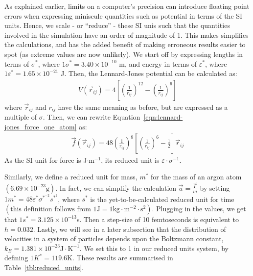 \documentclass[../Main.tex]{subfiles}
\begin{document}
As explained earlier, limits on a computer's precision can introduce floating point errors when expressing miniscule quantities such as potential in terms of the SI units. Hence, we scale - or ``reduce'' - these SI unis such that the quantities involved in the simulation have an order of magnitude of 1. This makes simplifies the calculations, and has the added benefit of making erroneous results easier to spot (as extreme values are now unlikely). We start off by expressing lengths in terms of $\sigma^{*}$, where $1\sigma^{*} = 3.40 \times 10^{-10}$ m, and energy in terms of $\varepsilon^{*}$, where $1 \varepsilon^{*}= 1.65 \times 10^{-21}$ J. Then, the Lennard-Jones potential can be calculated as:
\begin{align}
	V\left(\vec{r}_{ij}\right) = 4 \left[ \left( \frac{1}{r_{ij}}\right)^{12} - \left( \frac{1}{r_{ij}}\right)^{6} \right] \label{eqn:lennard-jones_potential_reduced}
\end{align}
where $\vec{r}_{ij}$ and $r_{ij}$ have the same meaning as before, but are expressed as a multiple of $\sigma$.
Then, we can rewrite Equation~\ref{eqn:lennard-jones_force_one_atom} as:
\begin{align}
\vec{f}\left(\vec{r}_{ij}\right) = 48\left( \frac{1}{r_{ij}}\right)^{8} \left[ \left( \frac{1}{r_{ij}}\right)^{6} - \frac{1}{2}\right]\vec{r}_{ij} \label{eqn:lennard-jones_force_reduced_one_atom}
\end{align}
As the SI unit for force is J$\cdot\mbox{m}^{-1}$, its reduced unit is $\varepsilon\cdot\sigma^{-1}$.

Similarly, we define a reduced unit for mass, $m^{*}$ for the mass of an argon atom $\left(6.69 \times 10^{-23} \mbox{g} \right)$. In fact, we can simplify the calculation $\vec{a} = \frac{\vec{F}}{m}$ by setting $1 m^{*} = 48\varepsilon^{*}\sigma^{*^{-2}}s^{*^{2}}$, where $s^{*}$ is the yet-to-be-calculated reduced unit for time $\left(\mbox{this definition follows from } 1 \mbox{J} = 1 \mbox{kg}\cdot\mbox{m}^{-2}\cdot \mbox{s}^{2}\right)$. Plugging in the values, we get that $1 s^{*} = 3.125 \times 10^{-13}$s. Then a step-size of 10 femtoseconds is equivalent to $h = 0.032$.
Lastly, we will see in a later subsection that the distribution of velocities in a system of particles depends upon the Boltzmann constant, $k_{B} = 1.381 \times 10^{-23} \mbox{J}\cdot\mbox{K}^{-1}$. We set this to 1 in our reduced units system, by defining $1 K^{*} = 119.6 \mbox{K}$. These results are summarised in Table~\ref{tbl:reduced_units}.
\end{document}
